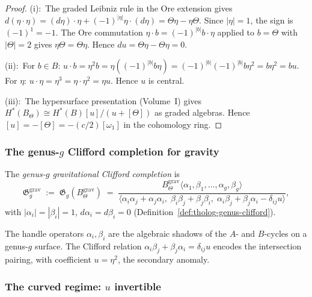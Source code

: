 \begin{proof}
(i):\ The graded Leibniz rule in the Ore extension gives
$d(\eta \cdot \eta)
= (d\eta)\cdot\eta + (-1)^{|\eta|}\eta\cdot(d\eta)
= \Theta\eta - \eta\Theta$.
Since $|\eta| = 1$, the sign is $(-1)^1 = -1$.
The Ore commutation $\eta \cdot b = (-1)^{|b|}b \cdot \eta$
applied to $b = \Theta$ with $|\Theta| = 2$ gives
$\eta\Theta = \Theta\eta$.
Hence $du = \Theta\eta - \Theta\eta = 0$.

(ii):\ For $b \in B$:
$u \cdot b = \eta^2 b = \eta((-1)^{|b|} b\eta)
= (-1)^{|b|}(-1)^{|b|}b\eta^2 = b\eta^2 = bu$.
For $\eta$: $u \cdot \eta = \eta^3 = \eta \cdot \eta^2 = \eta u$.
Hence $u$ is central.

(iii):\ The hypersurface presentation
(Volume~I)
gives $H^*(B_\Theta) \cong H^*(B)[u]/(u + [\Theta])$ as graded
algebras. Hence $[u] = -[\Theta] = -(c/2)[\omega_1]$
in the cohomology ring.
\end{proof}

\subsubsection*{The genus-$g$ Clifford completion for gravity}

\begin{definition}
\label{def:gravity-genus-g-completion}
The \emph{genus-$g$ gravitational Clifford completion} is
\[
\mathfrak{G}_g^{\mathrm{grav}}
\;:=\;
\mathfrak{G}_g(B_\Theta^{\mathrm{grav}})
\;=\;
\frac{
 B_\Theta^{\mathrm{grav}}
 \langle \alpha_1, \beta_1, \ldots, \alpha_g, \beta_g \rangle
}{
 \langle
 \alpha_i\alpha_j + \alpha_j\alpha_i,\;
 \beta_i\beta_j + \beta_j\beta_i,\;
 \alpha_i\beta_j + \beta_j\alpha_i - \delta_{ij}u
 \rangle
},
\]
with $|\alpha_i| = |\beta_i| = 1$, $d\alpha_i = d\beta_i = 0$
\textup{(}Definition~\textup{\ref{def:tholog-genus-clifford}}\textup{)}.
\end{definition}

The handle operators $\alpha_i, \beta_i$ are the algebraic
shadows of the $A$- and $B$-cycles on a genus-$g$ surface.
The Clifford relation $\alpha_i\beta_j + \beta_j\alpha_i
= \delta_{ij}u$ encodes the intersection pairing, with
coefficient $u = \eta^2$, the secondary anomaly.

\subsubsection*{The curved regime: $u$ invertible}

